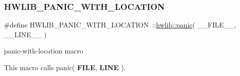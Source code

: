 \subsubsection{\texorpdfstring{H\+W\+L\+I\+B\+\_\+\+P\+A\+N\+I\+C\+\_\+\+W\+I\+T\+H\+\_\+\+L\+O\+C\+A\+T\+I\+ON}{HWLIB\_PANIC\_WITH\_LOCATION}}
{\footnotesize\ttfamily \#define H\+W\+L\+I\+B\+\_\+\+P\+A\+N\+I\+C\+\_\+\+W\+I\+T\+H\+\_\+\+L\+O\+C\+A\+T\+I\+ON~\+::\hyperlink{namespacehwlib_a80caa11d8c2b6dd8d5a6655273e3c7d3}{hwlib\+::panic}( \+\_\+\+\_\+\+F\+I\+L\+E\+\_\+\+\_\+, \+\_\+\+\_\+\+L\+I\+N\+E\+\_\+\+\_\+ )}

panic-\/with-\/location macro

This macro calls panic( {\bfseries F\+I\+LE}, {\bfseries L\+I\+NE} ). 
